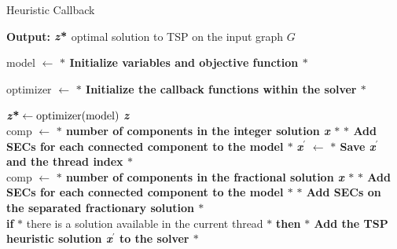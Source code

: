 \begin{algorithm}
    \caption{Heuristic Callback}\label{Heuristic Callback}
    \hspace*{\algorithmicindent} \textbf{Output:} $\textbf{\textit{z}\text{*}} $ optimal solution to TSP on the input graph $G$
    \begin{algorithmic}[1]
  \State model $ \leftarrow $ \textbf{$\ast$ Initialize variables and objective function $\ast$ }
  
  \State optimizer $ \leftarrow $ \textbf{$\ast$ Initialize the callback functions within the solver $\ast$ }
    	\end{algorithmic}
	\label{alg:heucall}
   	\end{algorithm}
	\vspace{1cm}
	\begin{algorithm}                     
   	 \begin{algorithmic} [1]              
  \State $\textbf{\textit{z}\text{*}} \gets \text{optimizer(model)}$
  \State \Return \textbf{\textit{z}\text{*}}
\EndFunction
\\
  \State comp $ \leftarrow $ \textbf{$\ast$ number of components in the integer solution \textit{x} $\ast$ }
	\State \textbf{$\ast$ Add SECs for each connected component to the model $\ast$ }
	\State \textbf{\textit{x}$^{\prime}$} $ \leftarrow $ 
	\State \textbf{$\ast$ Save \textbf{\textit{x}$^{\prime}$} and the thread index $\ast$ }
	\EndIf  
	\State \Return 
	\EndFunction
	\\
  \State comp $ \leftarrow $ \textbf{$\ast$ number of components in the fractional solution \textit{x} $\ast$ }
	\State \textbf{$\ast$ Add SECs for each connected component to the model $\ast$ }
	\EndIf
	\State \textbf{$\ast$ Add SECs on the separated fractionary solution $\ast$ }
	\EndIf 
	\State \Return 
	\EndFunction
	\\
	\State \textbf{if} $\ast$ there is a solution available in the current thread $\ast$ \textbf{then}
	\State \textbf{$\ast$ Add the TSP heuristic solution \textbf{\textit{x}$^{\prime}$} to the solver $\ast$ }
	\State \Return 
	\EndFunction

    \end{algorithmic}
    
    \end{algorithm}
    
